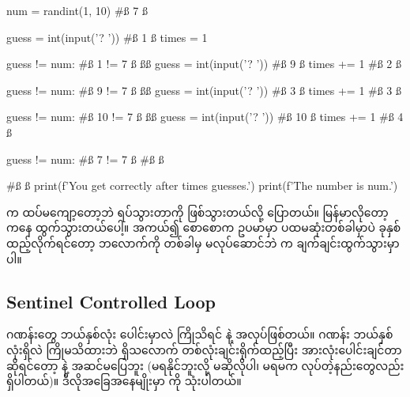 %
\begin{py}
num = randint(1, 10)            #ß 7 ß

guess = int(input('? '))        #ß 1 ß
times = 1

guess != num:                   #ß 1 != 7 ß
    ßß
    guess = int(input('? '))    #ß 9 ß
    times += 1                  #ß 2 ß

guess != num:                   #ß 9 != 7 ß
    ßß
    guess = int(input('? '))    #ß 3 ß
    times += 1                  #ß 3 ß

guess != num:                   #ß 10 != 7 ß
    ßß
    guess = int(input('? '))    #ß 10 ß
    times += 1                  #ß 4 ß

guess != num:                   #ß 7 != 7 ß
    #ß ß

#ß ß
print(f'You get correctly after {times} guesses.')
print(f'The number is {num}.')  
\end{py}
%

 က ထပ်မကျော့တော့ဘဲ  ရပ်သွားတာကို   ဖြစ်သွားတယ်လို့ ပြောတယ်။ မြန်မာလိုတော့  ကနေ ထွက်သွားတယ်ပေါ့။ အကယ်၍ စောစောက ဥပမာမှာ ပထမဆုံးတစ်ခါမှာပဲ ခုနှစ် ထည့်လိုက်ရင်တော့ ဘလောက်ကို တစ်ခါမှ မလုပ်ဆောင်ဘဲ  က ချက်ချင်းထွက်သွားမှာပါ။

\subsection*{Sentinel Controlled Loop}
ဂဏန်းတွေ ဘယ်နှစ်လုံး ပေါင်းမှာလဲ ကြိုသိရင်   နဲ့ အလုပ်ဖြစ်တယ်။ ဂဏန်း ဘယ်နှစ်လုံးရှိလဲ ကြိုမသိထားဘဲ ရှိသလောက် တစ်လုံးချင်းရိုက်ထည့်ပြီး အားလုံးပေါင်းချင်တာဆိုရင်တော့   နဲ့ အဆင်မပြေဘူး (မရနိုင်ဘူးလို့ မဆိုလိုပါ၊ မရမက လုပ်တဲ့နည်းတွေလည်း ရှိပါတယ်)။ ဒီလိုအခြေအနေမျိုးမှာ  ကို သုံးပါတယ်။ 

